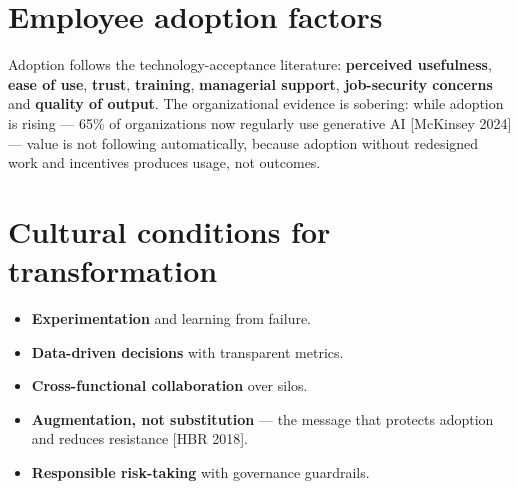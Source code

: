 \begin{center}
  \renewcommand{\arraystretch}{1.45}
\end{center}

\section{Employee adoption factors}

Adoption follows the technology-acceptance literature: \textbf{perceived
usefulness}, \textbf{ease of use}, \textbf{trust}, \textbf{training},
\textbf{managerial support}, \textbf{job-security concerns} and \textbf{quality
of output}. The organizational evidence is sobering: while adoption is
rising — 65\% of organizations now regularly use generative AI [McKinsey
2024] — value is not following automatically, because adoption without
redesigned work and incentives produces usage, not outcomes.

\section{Cultural conditions for transformation}

\begin{itemize}
  \item \textbf{Experimentation} and learning from failure.
  \item \textbf{Data-driven decisions} with transparent metrics.
  \item \textbf{Cross-functional collaboration} over silos.
  \item \textbf{Augmentation, not substitution} — the message that protects
        adoption and reduces resistance [HBR 2018].
  \item \textbf{Responsible risk-taking} with governance guardrails.
\end{itemize}

